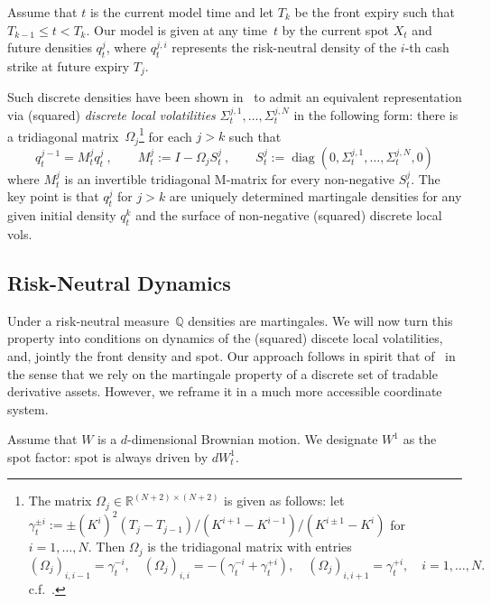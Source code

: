 \documentclass[11pt]{article}
\newcommand{\Q}{\mathbb Q}
\theoremstyle{plain}
\theoremstyle{definition}
\theoremstyle{remark}
\begin{document}
{Assume that $t$ is the current model time and let $T_k$ be the front expiry such that $T_{k-1}\leq t<T_k$.
Our model is given at any time~$t$
by the current spot $X_t$ and future densities $q_t^j$, where $q_t^{j,i}$ represents the risk-neutral density of the $i$-th cash strike at future expiry $T_j$.

Such discrete densities have been shown in~\cite{BuehlerRyskin2016} to admit an equivalent representation via (squared) \emph{discrete local volatilities} $\Sigma_t^{j,1},\ldots,\Sigma_t^{j,N}$ in the following form:
there is a tridiagonal matrix~$\Omega_j$\footnote{
  The matrix $\Omega_j\in\mathbb R^{(N+2)\times(N+2)}$ is given as follows: 
  let $\gamma_t^{\pm i} := \pm (K^{i})^2 (T_j-T_{j-1}) / (K^{i+1}-K^{i-1}) / (K^{i\pm 1} - K^i) $ for $i=1,\ldots,N$.
  Then $\Omega_j$ is the tridiagonal matrix with entries
  \[
    (\Omega_j)_{i,i-1} = \gamma_t^{-i},\quad
    (\Omega_j)_{i,i} = -(\gamma_t^{-i}+\gamma_t^{+i}),\quad
    (\Omega_j)_{i,i+1} = \gamma_t^{+i},\quad i=1,\ldots,N.
  \]
  c.f.~\cite{SANOS2026}.
 } for each $j>k$ such that 
    \begin{equation}
      q_t^{j-1}=M_t^jq_t^j \ ,
      \qquad
      M_t^j:=I-\Omega_jS_t^j \ ,
      \qquad
      S_t^j:=\operatorname{diag}(0,\Sigma_t^{j,1},\ldots,
        \Sigma_t^{j,N},0) 
      \label{eq:hb_dlv}
    \end{equation}
where $M^j_t$ is an invertible tridiagonal M-matrix for every non-negative $S_t^j$. The key point is that $q_t^j$ for $j>k$ are uniquely determined martingale densities
for any given initial density $q_t^k$ and the surface of non-negative (squared) discrete local vols.


  \subsection{Risk-Neutral Dynamics}

Under a risk-neutral measure~$\Q$ densities are martingales. We will now turn this property into conditions on dynamics of the (squared) discete local volatilities, and, 
jointly the front density and spot. 
      Our approach follows in spirit that of~\cite{Wissel2007} in the sense that we rely on the martingale property of a discrete set of tradable derivative assets.
      However, we reframe it in a much more accessible coordinate system.

Assume that $W$ is a $d$-dimensional Brownian motion. We designate $W^1$ as the
      spot factor: spot is always driven by $dW_t^1$.


}
\end{document}

